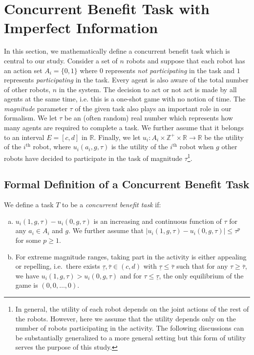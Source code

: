 \documentclass[conference]{ieeeconf}
\def\Z{\mathbb{Z}}    %
\def\R{\mathbb{R}}    %
\begin{document}
\section{Concurrent Benefit Task with Imperfect Information}\label{sec:conbenefit}
In this section, we mathematically define a concurrent benefit task which is central to our study. Consider a set of $n$ robots and suppose that each robot has an action set $A_i=\{0,1\}$ where $0$ represents \emph{not participating} in the task and $1$ represents \emph{participating} in the task. Every agent is also aware of the total number of other robots, $n$ in the system. The decision to act or not act is made by all agents at the same time, i.e. this is a one-shot game with no notion of time. The \emph{magnitude} parameter $\tau$ of the given task also plays an important role in our formalism. We let $\tau$ be an (often random) real number which represents how many agents are required to complete a task. We further assume that it belongs to an interval $E=[c,d]$ in $\R$.  Finally, we let $u_i:A_i\times\Z^+\times \R\to \R$ be the utility of the $i^{\text{th}}$ robot, where $u_i(a_i,g,\tau)$ is the utility of the $i^{\text{th}}$ robot when $g$ other robots have decided to participate in the task of magnitude $\tau$\footnote{In general, the utility of each robot depends on the joint actions of the rest of the robots. However, here we assume that the utility depends only on the number of robots participating in the activity. The following discussions can be substantially generalized to a more general setting but this form of utility serves the purpose of this study.}. 

\subsection{Formal Definition of a Concurrent Benefit Task}\label{subsec:conbenefitdef}
We define a task $T$ to be a \emph{concurrent benefit task} if:
\begin{enumerate}[a.]
	\item $u_i(1,g,\tau)-u_i(0,g,\tau)$ is an increasing and continuous function of $\tau$ for any $a_i\in A_i$ and $g$. We further assume that $|u_i(1,g,\tau)-u_i(0,g,\tau)|\leq \tau^p$ for some $p\geq 1$. 
	\item For extreme magnitude ranges, taking part in the activity is either appealing or repelling, i.e.\ there exists $\underline{\tau},\bar{\tau}\in (c,d)$ with $\underline{\tau}\leq \bar{\tau}$ such that for any $\tau\geq \bar{\tau}$, we have $u_i(1,g,\tau)>u_i(0,g,\tau)$ and for $\tau\leq \underline{\tau}$, the only equilibrium of the game is $(0,0,\ldots,0)$. 
\end{enumerate}
\end{document}
